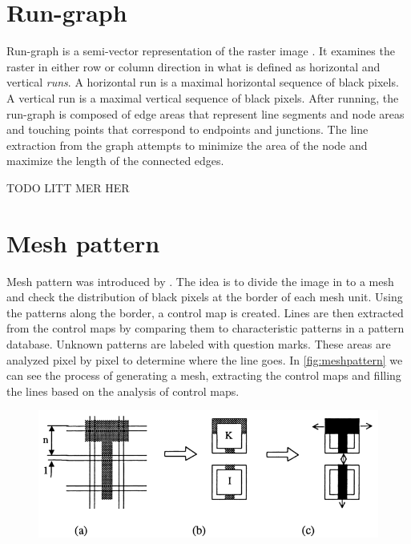\section{Run-graph}
Run-graph is a semi-vector representation of the raster image \cite{Monagan1993}. It examines the raster in either row or column direction in what is defined as horizontal and vertical \emph{runs}. A horizontal run is a maximal horizontal sequence of black pixels. A vertical run is a maximal vertical sequence of black pixels. After running, the run-graph is composed of edge areas that represent line segments and node areas and touching points that correspond to endpoints and junctions. The line extraction from the graph attempts to minimize the area of the node and maximize the length of the connected edges.

TODO LITT MER HER

\section{Mesh pattern}
Mesh pattern was introduced by \citeauthor{Lin1985}\cite{Lin1985}. The idea is to divide the image in to a mesh and check the distribution of black pixels at the border of each mesh unit. Using the patterns along the border, a control map is created. Lines are then extracted from the control maps by comparing them to characteristic patterns in a pattern database. Unknown patterns are labeled with question marks. These areas are analyzed pixel by pixel to determine where the line goes. In \autoref{fig:meshpattern} we can see the process of generating a mesh, extracting the control maps and filling the lines based on the analysis of control maps. 

\begin{figure}[H]
	\centering
	\includegraphics[width=0.8\linewidth]{fig/meshpattern.png}
	\label{fig:meshpattern}
\end{figure}

